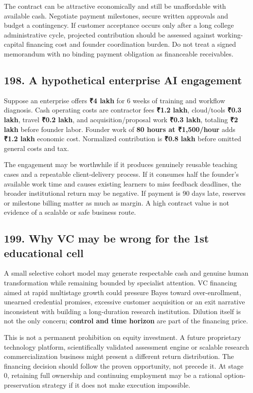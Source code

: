 The contract can be attractive economically and still be unaffordable with available cash. Negotiate payment milestones, secure written approvals and budget a contingency. If customer acceptance occurs only after a long college administrative cycle, projected contribution should be assessed against working-capital financing cost and founder coordination burden. Do not treat a signed memorandum with no binding payment obligation as financeable receivables.

\subsection{198. A hypothetical enterprise AI engagement}


Suppose an enterprise offers \textbf{₹4 lakh} for 6 weeks of training and workflow diagnosis. Cash operating costs are contractor fees \textbf{₹1.2 lakh}, cloud/tools \textbf{₹0.3 lakh}, travel \textbf{₹0.2 lakh}, and acquisition/proposal work \textbf{₹0.3 lakh}, totaling \textbf{₹2 lakh} before founder labor. Founder work of \textbf{80 hours at ₹1,500/hour} adds \textbf{₹1.2 lakh} economic cost. Normalized contribution is \textbf{₹0.8 lakh} before omitted general costs and tax.

The engagement may be worthwhile if it produces genuinely reusable teaching cases and a repeatable client-delivery process. If it consumes half the founder's available work time and causes existing learners to miss feedback deadlines, the broader institutional return may be negative. If payment is 90 days late, reserves or milestone billing matter as much as margin. A high contract value is not evidence of a scalable or safe business route.

\subsection{199. Why VC may be wrong for the 1st educational cell}


A small selective cohort model may generate respectable cash and genuine human transformation while remaining bounded by specialist attention. VC financing aimed at rapid multistage growth could pressure Bayes toward over-enrollment, unearned credential promises, excessive customer acquisition or an exit narrative inconsistent with building a long-duration research institution. Dilution itself is not the only concern; \textbf{control and time horizon} are part of the financing price.

This is not a permanent prohibition on equity investment. A future proprietary technology platform, scientifically validated assessment engine or scalable research commercialization business might present a different return distribution. The financing decision should follow the proven opportunity, not precede it. At stage 0, retaining full ownership and continuing employment may be a rational option-preservation strategy if it does not make execution impossible.

